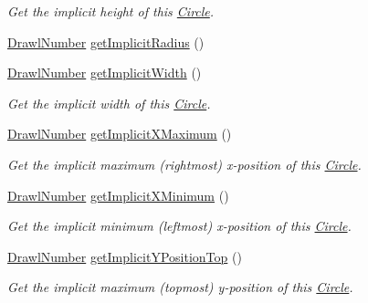 \begin{DoxyCompactItemize}
\begin{DoxyCompactList}\small\item\em Get the implicit height of this \hyperlink{classcom_1_1aarrelaakso_1_1drawl_1_1_circle}{Circle}. \end{DoxyCompactList}\item 
\hyperlink{classcom_1_1aarrelaakso_1_1drawl_1_1_drawl_number}{Drawl\+Number} \hyperlink{classcom_1_1aarrelaakso_1_1drawl_1_1_circle_a8538bba4325dbf2c95ab3a597bcb70c6}{get\+Implicit\+Radius} ()
\item 
\hyperlink{classcom_1_1aarrelaakso_1_1drawl_1_1_drawl_number}{Drawl\+Number} \hyperlink{classcom_1_1aarrelaakso_1_1drawl_1_1_circle_a63c0bcbf1138de1f85041213116c1d3a}{get\+Implicit\+Width} ()
\begin{DoxyCompactList}\small\item\em Get the implicit width of this \hyperlink{classcom_1_1aarrelaakso_1_1drawl_1_1_circle}{Circle}. \end{DoxyCompactList}\item 
\hyperlink{classcom_1_1aarrelaakso_1_1drawl_1_1_drawl_number}{Drawl\+Number} \hyperlink{classcom_1_1aarrelaakso_1_1drawl_1_1_circle_a9f611727bb4828ab95c9c1c7059f5c6d}{get\+Implicit\+X\+Maximum} ()
\begin{DoxyCompactList}\small\item\em Get the implicit maximum (rightmost) x-\/position of this \hyperlink{classcom_1_1aarrelaakso_1_1drawl_1_1_circle}{Circle}. \end{DoxyCompactList}\item 
\hyperlink{classcom_1_1aarrelaakso_1_1drawl_1_1_drawl_number}{Drawl\+Number} \hyperlink{classcom_1_1aarrelaakso_1_1drawl_1_1_circle_a592ebc277b29fc55879799f7ea195a79}{get\+Implicit\+X\+Minimum} ()
\begin{DoxyCompactList}\small\item\em Get the implicit minimum (leftmost) x-\/position of this \hyperlink{classcom_1_1aarrelaakso_1_1drawl_1_1_circle}{Circle}. \end{DoxyCompactList}\item 
\hyperlink{classcom_1_1aarrelaakso_1_1drawl_1_1_drawl_number}{Drawl\+Number} \hyperlink{classcom_1_1aarrelaakso_1_1drawl_1_1_circle_ae0bd8b2be28e991318bbc8e37b99553d}{get\+Implicit\+Y\+Position\+Top} ()
\begin{DoxyCompactList}\small\item\em Get the implicit maximum (topmost) y-\/position of this \hyperlink{classcom_1_1aarrelaakso_1_1drawl_1_1_circle}{Circle}. \end{DoxyCompactList}\item 

\end{DoxyCompactItemize}
